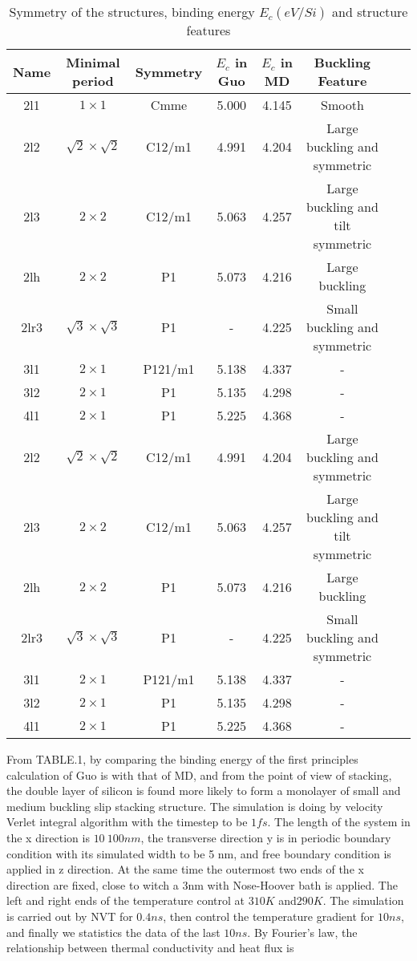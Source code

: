 \documentclass[%
 reprint,
 amsmath,amssymb,
 aps,
prb,
]{revtex4-1}
\begin{document}
\begin{table*}
\caption{\label{tab:table1}
Symmetry of the structures, binding energy $E_c(eV/Si)$ and structure features}
\begin{ruledtabular}
\begin{tabular}{cccccccc}
 Name
 &Minimal period
 &Symmetry
 &$E_c$ in Guo
 &$E_c$ in MD
 &Buckling Feature\\
\hline
2l1 & $1 \times 1$ & Cmme & 5.000 &4.145 &Smooth \\
2l2 & $\sqrt{2}\times\sqrt{2}$ & C12/m1 & 4.991 & 4.204 & Large buckling and symmetric\\
2l3 & $2 \times 2$ & C12/m1 & 5.063 & 4.257 & Large buckling and tilt symmetric\\
2lh & $2 \times 2$ & P1 & 5.073 & 4.216 & Large buckling\\
2lr3 & $\sqrt{3}\times\sqrt{3}$ & P1 & - & 4.225 & Small buckling and symmetric\\
3l1 & $2 \times 1$ & P121/m1 & 5.138 & 4.337 & -\\
3l2 & $2 \times 1$ & P1 & 5.135 & 4.298 & -\\
4l1 & $2 \times 1$ & P1 & 5.225 & 4.368 & -\\
2l2 &$\sqrt{2}\times\sqrt{2}$ & C12/m1 & 4.991 & 4.204 & Large buckling and symmetric\\
2l3 & $2 \times 2$ & C12/m1 & 5.063 & 4.257 & Large buckling and tilt symmetric\\
2lh & $2 \times 2$ & P1 & 5.073 & 4.216 & Large buckling\\
2lr3 & $\sqrt{3}\times\sqrt{3}$ & P1 & - & 4.225 & Small buckling and symmetric\\
3l1 & $2 \times 1$ & P121/m1 & 5.138 & 4.337 & -\\
3l2 & $2 \times 1$ & P1 & 5.135 & 4.298 & -\\
4l1 & $2 \times 1$ & P1 & 5.225 & 4.368 & -\\

\end{tabular}
\end{ruledtabular}
\end{table*}

From TABLE.1, by comparing the binding energy of the first principles calculation of Guo is with that of MD, and from the point of view of stacking, the double layer of silicon is found more likely to form a monolayer of small and medium buckling slip stacking structure. The simulation is doing by velocity Verlet integral algorithm with the timestep to be $1 fs$. The length of the system in the x direction is $10~100nm$, the transverse direction y is in periodic boundary condition with its simulated width to be 5 nm, and free boundary condition is applied in z direction. At the same time the outermost two ends of the x direction are fixed, close to witch a 3nm with Nose-Hoover bath is applied. The left and right ends of the temperature control at $310K$ and$ 290K$. The simulation is carried out by NVT for $0.4ns$, then control the temperature gradient for $10 ns$, and finally we statistics the data of the last $10ns$. By Fourier's law, the relationship between thermal conductivity and heat flux is
\end{document}
